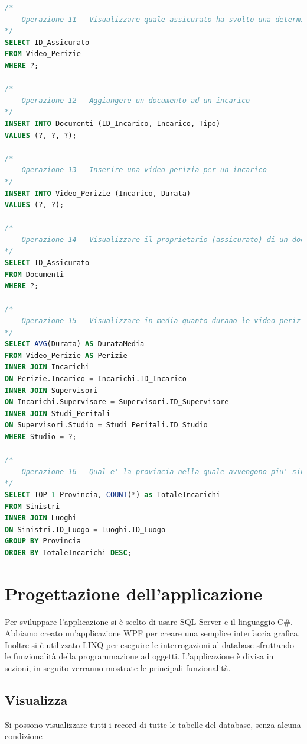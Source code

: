 \documentclass[a4paper,12pt]{report}
\begin{document}
\begin{lstlisting}[language=SQL]
/*
    Operazione 11 - Visualizzare quale assicurato ha svolto una determinata video-perizia 
*/
SELECT ID_Assicurato
FROM Video_Perizie
WHERE ?;

/*
    Operazione 12 - Aggiungere un documento ad un incarico 
*/
INSERT INTO Documenti (ID_Incarico, Incarico, Tipo)
VALUES (?, ?, ?);

/*
    Operazione 13 - Inserire una video-perizia per un incarico 
*/
INSERT INTO Video_Perizie (Incarico, Durata)
VALUES (?, ?);

/*
    Operazione 14 - Visualizzare il proprietario (assicurato) di un documento
*/
SELECT ID_Assicurato
FROM Documenti
WHERE ?;

/*
    Operazione 15 - Visualizzare in media quanto durano le video-perizie di un determinato studio peritale 
*/
SELECT AVG(Durata) AS DurataMedia
FROM Video_Perizie AS Perizie
INNER JOIN Incarichi 
ON Perizie.Incarico = Incarichi.ID_Incarico
INNER JOIN Supervisori
ON Incarichi.Supervisore = Supervisori.ID_Supervisore
INNER JOIN Studi_Peritali 
ON Supervisori.Studio = Studi_Peritali.ID_Studio
WHERE Studio = ?;

/*
    Operazione 16 - Qual e' la provincia nella quale avvengono piu' sinistri
*/
SELECT TOP 1 Provincia, COUNT(*) as TotaleIncarichi
FROM Sinistri 
INNER JOIN Luoghi
ON Sinistri.ID_Luogo = Luoghi.ID_Luogo
GROUP BY Provincia
ORDER BY TotaleIncarichi DESC;
\end{lstlisting}





\chapter{Progettazione dell'applicazione}

Per sviluppare l'applicazione si è scelto di usare SQL Server e il linguaggio C\#.
Abbiamo creato un'applicazione WPF per creare una semplice interfaccia grafica.
Inoltre si è utilizzato LINQ per eseguire le interrogazioni al database sfruttando le funzionalità della programmazione ad oggetti.
L'applicazione è divisa in sezioni, in seguito verranno mostrate le principali funzionalità.

\section{Visualizza}
Si possono visualizzare tutti i record di tutte le tabelle del database, senza alcuna condizione
\end{document}
